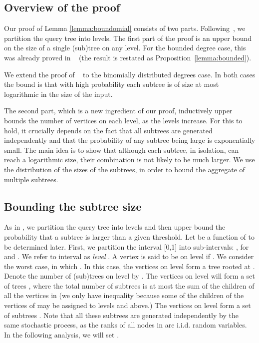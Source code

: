 \documentclass[english, oribibl]{llncs}
\begin{document}
\subsection{Overview of the proof}

Our proof of Lemma \ref{lemma:boundomial} consists of two parts. Following~\cite{ARV+11}, we partition the query tree into levels.
The first part of the proof is an upper bound on the size of a single (sub)tree on any level.
For the bounded degree case, this was already proved in ~\cite{ARV+11} (the result is restated as Proposition~\ref{lemma:bounded}).




We extend the proof of ~\cite{ARV+11} to the binomially distributed degrees case. In both cases the bound is that with high probability each subtree is of size at most logarithmic in the size of the input.

The second part, which is a new ingredient of our proof,
inductively upper bounds the number of vertices on each level, as the levels increase.
For this to hold, it crucially depends on the fact that all subtrees are generated independently and that the probability of any subtree being large is exponentially small.
The main idea is to show that although each subtree, in isolation, can reach a logarithmic size, their combination is not likely to be much larger. We use the distribution of the sizes of the subtrees, in order to bound the aggregate of multiple subtrees.





\subsection{Bounding the subtree size}



As in \cite{ARV+11}, we partition the query tree into levels and then upper bound
the probability that a subtree is larger than a given threshold.
Let  be a function of  to be determined later.
First, we partition the interval [0,1] into  sub-intervals:
,
for  and .
We refer to interval  as \emph{level} .
A vertex  is said to be on level  if .
We consider the worst case, in which .
In this case, the vertices on level  form a tree  rooted at .
Denote the number of (sub)trees on level   by .
The vertices on level  will form a set of trees ,
where the total number of subtrees is at most the sum of the children of all the vertices in 
(we only have inequality because some of the children of the vertices of 
may be assigned to levels  and above.)
The vertices on level  form a set of subtrees .
Note that all these subtrees  are generated independently by the same stochastic process, as the ranks of all nodes in  are i.i.d. random variables. In the following analysis, we will set .
\end{document}

